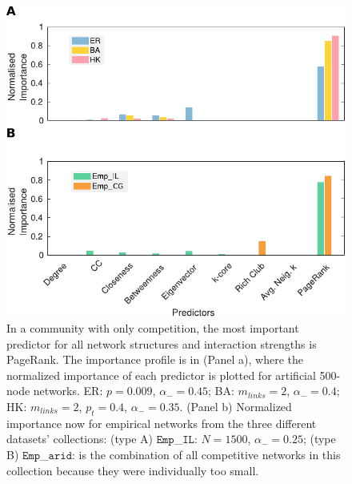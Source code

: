 \begin{figure}
    \centering
    \includegraphics{figures/chp2/fig_5.pdf}
    \caption[Importance profile for competition]{In a community with only competition, the most important predictor for all network structures and interaction strengths is PageRank. The importance profile is in (Panel a), where the normalized importance of each predictor  is plotted for artificial 500-node networks. ER: $p =  0.009$, $\alpha_- = 0.45$; BA: $m_{links} = 2$, $\alpha_- = 0.4$; HK: $m_{links} = 2$, $p_t = 0.4$, $\alpha_- = 0.35$.  (Panel b) Normalized importance now for empirical networks from the three different datasets' collections: (type A) $\texttt{Emp}$\_$\texttt{IL}$: $N = 1500$, $\alpha_- = 0.25$; (type B) $\texttt{Emp}$\_$\texttt{arid}$: is the combination of all competitive networks in this collection because they were individually too small.}
    \label{chp2:fig:7}
\end{figure}

